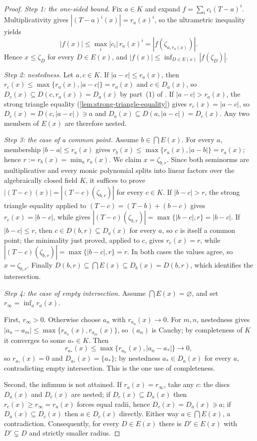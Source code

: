 \begin{proof}
\emph{Step 1: the one-sided bound.}
Fix $a\in K$ and expand $f=\sum_ic_i(T-a)^i$.  Multiplicativity
gives $|(T-a)^i(x)|=r_a(x)^i$, so the ultrametric inequality yields
\[
 |f(x)|\leq\max_i|c_i|\,r_a(x)^i=|f(\zeta_{a,r_a(x)})|.
\]
Hence $x\leq\zeta_D$ for every $D\in E(x)$, and
$|f(x)|\le\inf_{D\in E(x)}|f(\zeta_D)|$.

\emph{Step 2: nestedness.}
Let $a,c\in K$.  If $|a-c|\leq r_a(x)$, then
$r_c(x)\leq\max\{r_a(x),|a-c|\}=r_a(x)$ and $c\in D_a(x)$, so
$D_c(x)\subseteq D(c,r_a(x))=D_a(x)$ by part~(1) of
.
If $|a-c|>r_a(x)$, the strong triangle equality
(\cref{lem:strong-triangle-equality}) gives $r_c(x)=|a-c|$, so
$D_c(x)=D(c,|a-c|)\ni a$ and
$D_a(x)\subseteq D(a,|a-c|)=D_c(x)$.  Any two members of $E(x)$ are
therefore nested.

\emph{Step 3: the case of a common point.}
Assume $b\in\bigcap E(x)$.  For every $a$, membership
$|b-a|\leq r_a(x)$ gives
$r_b(x)\leq\max\{r_a(x),|a-b|\}=r_a(x)$; hence
$r:=r_b(x)=\min_ar_a(x)$.  We claim $x=\zeta_{b,r}$.  Since both
seminorms are multiplicative and every monic polynomial splits into
linear factors over the algebraically closed field $K$, it suffices to
prove $|(T-c)(x)|=|(T-c)(\zeta_{b,r})|$ for every $c\in K$.  If
$|b-c|>r$, the strong triangle equality applied to
$(T-c)=(T-b)+(b-c)$ gives $r_c(x)=|b-c|$, while
 gives
$|(T-c)(\zeta_{b,r})|=\max\{|b-c|,r\}=|b-c|$.  If $|b-c|\leq r$,
then $c\in D(b,r)\subseteq D_a(x)$ for every $a$, so $c$ is
itself a common point; the minimality just proved, applied to $c$,
gives $r_c(x)=r$, while
$|(T-c)(\zeta_{b,r})|=\max\{|b-c|,r\}=r$.  In both cases the values
agree, so $x=\zeta_{b,r}$.  Finally
$D(b,r)\subseteq\bigcap E(x)\subseteq D_b(x)=D(b,r)$, which
identifies the intersection.

\emph{Step 4: the case of empty intersection.}
Assume $\bigcap E(x)=\varnothing$, and set
$r_\infty=\inf_ar_a(x)$.

First, $r_\infty>0$.  Otherwise choose $a_n$ with
$r_{a_n}(x)\to0$.  For $m,n$, nestedness gives
$|a_n-a_m|\leq\max\{r_{a_n}(x),r_{a_m}(x)\}$, so $(a_n)$ is Cauchy;
by completeness of $K$ it converges to some $a_*\in K$.  Then
\[
 r_{a_*}(x)\leq\max\{r_{a_n}(x),|a_n-a_*|\}\longrightarrow0,
\]
so $r_{a_*}(x)=0$ and $D_{a_*}(x)=\{a_*\}$; by nestedness
$a_*\in D_a(x)$ for every $a$, contradicting empty intersection.
This is the one use of completeness.

Second, the infimum is not attained.  If $r_a(x)=r_\infty$, take any
$c$: the discs $D_a(x)$ and $D_c(x)$ are nested; if
$D_c(x)\subseteq D_a(x)$ then $r_c(x)\ge r_\infty=r_a(x)$ forces
equal radii, hence $D_c(x)=D_a(x)\ni a$; if
$D_a(x)\subseteq D_c(x)$ then $a\in D_c(x)$ directly.  Either way
$a\in\bigcap E(x)$, a contradiction.  Consequently, for every
$D\in E(x)$ there is $D'\in E(x)$ with $D'\subsetneq D$ and
strictly smaller radius.


\end{proof}
